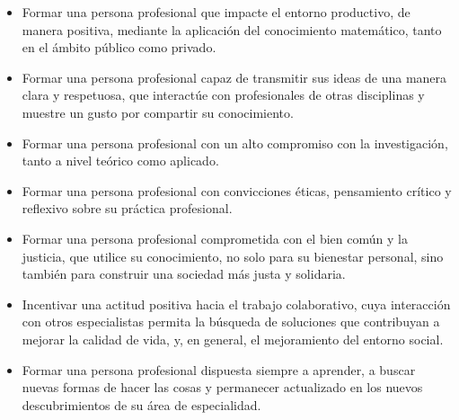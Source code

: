\begin{itemize}
    
    \color{blue} \item \color{black} Formar una persona profesional que impacte el entorno productivo, de manera positiva, mediante la aplicación del conocimiento matemático, tanto en el ámbito público como privado. 

     \color{blue} \item \color{black} Formar una persona profesional capaz de transmitir sus ideas de una manera clara y respetuosa, que interactúe con profesionales de otras disciplinas y muestre un gusto por compartir su conocimiento. 
     
    \color{blue} \item \color{black} Formar una persona profesional con un alto compromiso con la investigación, tanto a nivel teórico como aplicado.  
    
    \color{blue} \item \color{black} Formar una persona profesional con convicciones éticas, pensamiento crítico y reflexivo sobre su práctica profesional.  
    
    \color{blue} \item \color{black} Formar una persona profesional comprometida con el bien común y la justicia, que utilice su conocimiento, no solo para su bienestar personal, sino también para construir una sociedad más justa y solidaria.
    
    \color{blue} \item \color{black} Incentivar una actitud positiva hacia el trabajo colaborativo, cuya interacción con otros especialistas permita la búsqueda de soluciones que contribuyan a mejorar la calidad de vida, y, en general, el mejoramiento del entorno social. 
    
    \color{blue} \item \color{black} Formar una persona profesional dispuesta siempre a aprender, a buscar nuevas formas de hacer las cosas y permanecer actualizado en los nuevos descubrimientos de su área de especialidad.  
    \end{itemize}

